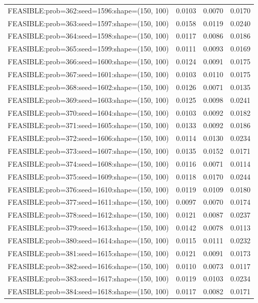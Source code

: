 \begin{longtable}{lccc}
FEASIBLE:prob=362:seed=1596:shape=(150, 100) &   0.0103 & 0.0070 & 0.0170 \\
FEASIBLE:prob=363:seed=1597:shape=(150, 100) &   0.0158 & 0.0119 & 0.0240 \\
FEASIBLE:prob=364:seed=1598:shape=(150, 100) &   0.0117 & 0.0086 & 0.0186 \\
FEASIBLE:prob=365:seed=1599:shape=(150, 100) &   0.0111 & 0.0093 & 0.0169 \\
FEASIBLE:prob=366:seed=1600:shape=(150, 100) &   0.0124 & 0.0091 & 0.0175 \\
FEASIBLE:prob=367:seed=1601:shape=(150, 100) &   0.0103 & 0.0110 & 0.0175 \\
FEASIBLE:prob=368:seed=1602:shape=(150, 100) &   0.0126 & 0.0071 & 0.0135 \\
FEASIBLE:prob=369:seed=1603:shape=(150, 100) &   0.0125 & 0.0098 & 0.0241 \\
FEASIBLE:prob=370:seed=1604:shape=(150, 100) &   0.0103 & 0.0092 & 0.0182 \\
FEASIBLE:prob=371:seed=1605:shape=(150, 100) &   0.0133 & 0.0092 & 0.0186 \\
FEASIBLE:prob=372:seed=1606:shape=(150, 100) &   0.0114 & 0.0130 & 0.0234 \\
FEASIBLE:prob=373:seed=1607:shape=(150, 100) &   0.0135 & 0.0152 & 0.0171 \\
FEASIBLE:prob=374:seed=1608:shape=(150, 100) &   0.0116 & 0.0071 & 0.0114 \\
FEASIBLE:prob=375:seed=1609:shape=(150, 100) &   0.0118 & 0.0170 & 0.0244 \\
FEASIBLE:prob=376:seed=1610:shape=(150, 100) &   0.0119 & 0.0109 & 0.0180 \\
FEASIBLE:prob=377:seed=1611:shape=(150, 100) &   0.0097 & 0.0070 & 0.0174 \\
FEASIBLE:prob=378:seed=1612:shape=(150, 100) &   0.0121 & 0.0087 & 0.0237 \\
FEASIBLE:prob=379:seed=1613:shape=(150, 100) &   0.0142 & 0.0078 & 0.0113 \\
FEASIBLE:prob=380:seed=1614:shape=(150, 100) &   0.0115 & 0.0111 & 0.0232 \\
FEASIBLE:prob=381:seed=1615:shape=(150, 100) &   0.0121 & 0.0091 & 0.0173 \\
FEASIBLE:prob=382:seed=1616:shape=(150, 100) &   0.0110 & 0.0073 & 0.0117 \\
FEASIBLE:prob=383:seed=1617:shape=(150, 100) &   0.0119 & 0.0103 & 0.0234 \\
FEASIBLE:prob=384:seed=1618:shape=(150, 100) &   0.0117 & 0.0082 & 0.0171 \\

\end{longtable}
